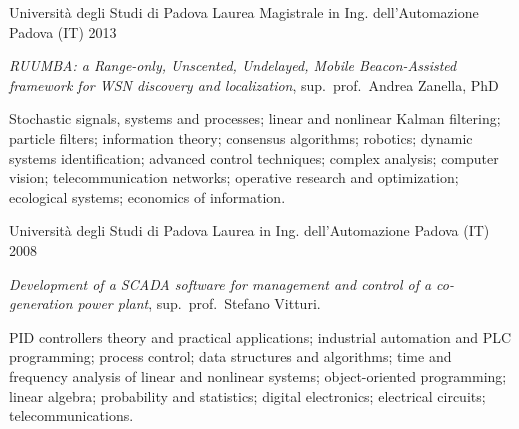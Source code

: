 
\begin{cventries}

	\cventry%
		{Università degli Studi di Padova}
		{Laurea Magistrale in Ing. dell'Automazione}
		{Padova (IT)}
		{2013}
		{\begin{cvitems}
			\item {\emph{RUUMBA: a Range-only, Unscented, Undelayed, Mobile Beacon-Assisted framework for WSN discovery and localization}, sup.~prof.~Andrea Zanella, PhD}
			\item {Stochastic signals, systems and processes; linear and nonlinear Kalman filtering; particle filters; information theory; consensus algorithms; robotics; dynamic systems identification; advanced control techniques; complex analysis; computer vision; telecommunication networks; operative research and optimization; ecological systems; economics of information.}
		\end{cvitems}}

	\cventry%
		{Università degli Studi di Padova}
		{Laurea in Ing. dell'Automazione}
		{Padova (IT)}
		{2008}
		{\begin{cvitems}
			\item {\emph{Development of a SCADA software for management and control of a co-generation power plant}, sup.~prof.~Stefano Vitturi.}
			\item {PID controllers theory and practical applications; industrial automation and PLC programming; process control; data structures and algorithms; time and frequency analysis of linear and nonlinear systems; object-oriented programming; linear algebra; probability and statistics; digital electronics; electrical circuits; telecommunications.}
		\end{cvitems}}


\end{cventries}
